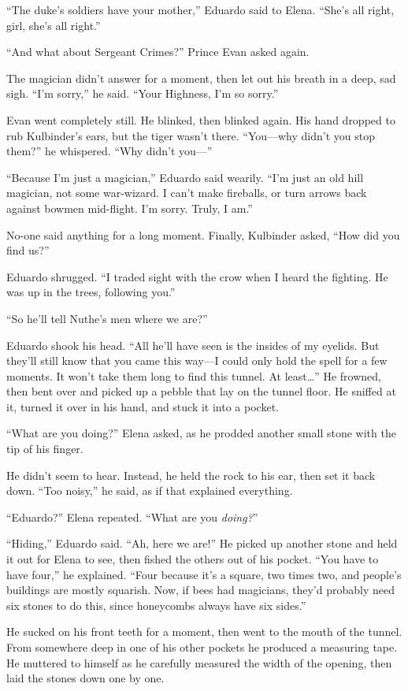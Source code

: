 \documentclass[10pt]{book}
\begin{document}
``The duke's soldiers have your mother,'' Eduardo said to Elena. ``She's all right, girl, she's all right.''

``And what about Sergeant Crimes?'' Prince Evan asked again.

The magician didn't answer for a moment, then let out his breath in a deep, sad sigh. ``I'm sorry,'' he said. ``Your Highness, I'm so sorry.''

Evan went completely still. He blinked, then blinked again. His hand dropped to rub Kulbinder's ears, but the tiger wasn't there. ``You---why didn't you stop them?'' he whispered. ``Why didn't you---''

``Because I'm just a magician,'' Eduardo said wearily. ``I'm just an old hill magician, not some war-wizard. I can't make fireballs, or turn arrows back against bowmen mid-flight. I'm sorry. Truly, I am.''

No-one said anything for a long moment. Finally, Kulbinder asked, ``How did you find us?''

Eduardo shrugged. ``I traded sight with the crow when I heard the fighting. He was up in the trees, following you.''

``So he'll tell Nuthe's men where we are?''

Eduardo shook his head. ``All he'll have seen is the insides of my eyelids.  But they'll still know that you came this way---I could only hold the spell for a few moments. It won't take them long to find this tunnel. At least{\ldots}'' He frowned, then bent over and picked up a pebble that lay on the tunnel floor. He sniffed at it, turned it over in his hand, and stuck it into a pocket.

``What are you doing?'' Elena asked, as he prodded another small stone with the tip of his finger.

He didn't seem to hear. Instead, he held the rock to his ear, then set it back down. ``Too noisy,'' he said, as if that explained everything.

``Eduardo?'' Elena repeated. ``What are you \emph{doing?}''

``Hiding,'' Eduardo said. ``Ah, here we are!'' He picked up another stone and held it out for Elena to see, then fished the others out of his pocket. ``You have to have four,'' he explained. ``Four because it's a square, two times two, and people's buildings are mostly squarish. Now, if bees had magicians, they'd probably need six stones to do this, since honeycombs always have six sides.''

He sucked on his front teeth for a moment, then went to the mouth of the tunnel. From somewhere deep in one of his other pockets he produced a measuring tape. He muttered to himself as he carefully measured the width of the opening, then laid the stones down one by one.
\end{document}
